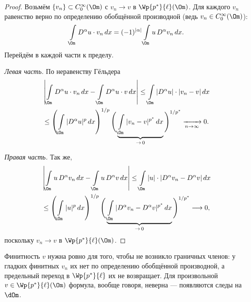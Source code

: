 \begin{proof}
Возьмём $\{v_n\} \subset C_0^\infty(\Om)$ с $v_n \to v$ в $\Wp{p^*}{\ell}(\Om)$. Для
каждого $v_n$ равенство верно по определению обобщённой производной (ведь
$v_n \in C_0^\infty(\Om)$):
\[
  \int\limits_\Om D^\alpha u \cdot v_n\, dx
  = (-1)^{|\alpha|} \int\limits_\Om u\, D^\alpha v_n\, dx .
\]
Перейдём в каждой части к пределу.

\emph{Левая часть.} По неравенству Гёльдера
\begin{multline*}
  \left| \int\limits_\Om D^\alpha u \cdot v_n\, dx - \int\limits_\Om D^\alpha u \cdot v\, dx \right|
  \le \int\limits_\Om |D^\alpha u| \cdot |v_n - v|\, dx \\
  \le \left( \int\limits_\Om |D^\alpha u|^p\, dx \right)^{1/p}
      \Bigg( \underbrace{\int\limits_\Om |v_n - v|^{p^*}\, dx}_{\to\, 0} \Bigg)^{1/p^*}
  \xrightarrow[n \to \infty]{} 0 .
\end{multline*}

\emph{Правая часть.} Так же,
\begin{multline*}
  \left| \int\limits_\Om u\, D^\alpha v_n\, dx - \int\limits_\Om u\, D^\alpha v\, dx \right|
  \le \int\limits_\Om |u| \cdot |D^\alpha v_n - D^\alpha v|\, dx \\
  \le \left( \int\limits_\Om |u|^p\, dx \right)^{1/p}
      \Bigg( \underbrace{\int\limits_\Om |D^\alpha v_n - D^\alpha v|^{p^*}\, dx}_{\to\, 0} \Bigg)^{1/p^*}
  \longrightarrow 0 ,
\end{multline*}
поскольку $v_n \to v$ в $\Wp{p^*}{\ell}(\Om)$.
\end{proof}

\begin{idea}
Финитность $v$ нужна ровно для того, чтобы не возникло граничных членов: у гладких
финитных $v_n$ их нет по определению обобщённой производной, а предельный переход
в $\Wp{p^*}{\ell}$ их не возвращает. Для произвольной $v \in \Wp{p^*}{\ell}(\Om)$ формула,
вообще говоря, неверна — появляются следы на $\dOm$.
\end{idea}
